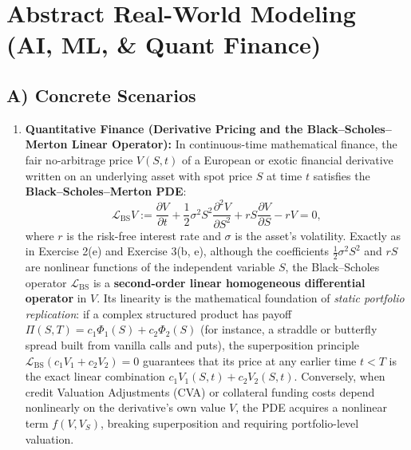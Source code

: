\documentclass[11pt,a4paper]{article}
\begin{document}
\section{Abstract Real-World Modeling (AI, ML, \& Quant Finance)}

\subsection{A) Concrete Scenarios}
\begin{enumerate}
    \item \textbf{Quantitative Finance (Derivative Pricing and the Black--Scholes--Merton Linear Operator):}
    In continuous-time mathematical finance, the fair no-arbitrage price $V(S, t)$ of a European or exotic financial derivative written on an underlying asset with spot price $S$ at time $t$ satisfies the \textbf{Black--Scholes--Merton PDE}:
    \[
        \mathcal{L}_{\text{BS}} V := \frac{\partial V}{\partial t} + \frac{1}{2}\sigma^2 S^2 \frac{\partial^2 V}{\partial S^2} + r S \frac{\partial V}{\partial S} - r V = 0,
    \]
    where $r$ is the risk-free interest rate and $\sigma$ is the asset's volatility. Exactly as in Exercise 2(e) and Exercise 3(b, e), although the coefficients $\frac{1}{2}\sigma^2 S^2$ and $rS$ are nonlinear functions of the independent variable $S$, the Black--Scholes operator $\mathcal{L}_{\text{BS}}$ is a \textbf{second-order linear homogeneous differential operator} in $V$. Its linearity is the mathematical foundation of \emph{static portfolio replication}: if a complex structured product has payoff $\Pi(S, T) = c_1 \Phi_1(S) + c_2 \Phi_2(S)$ (for instance, a straddle or butterfly spread built from vanilla calls and puts), the superposition principle $\mathcal{L}_{\text{BS}}(c_1 V_1 + c_2 V_2) = 0$ guarantees that its price at any earlier time $t < T$ is the exact linear combination $c_1 V_1(S, t) + c_2 V_2(S, t)$. Conversely, when credit Valuation Adjustments (CVA) or collateral funding costs depend nonlinearly on the derivative's own value $V$, the PDE acquires a nonlinear term $f(V, V_S)$, breaking superposition and requiring portfolio-level valuation.


\end{enumerate}
\end{document}
